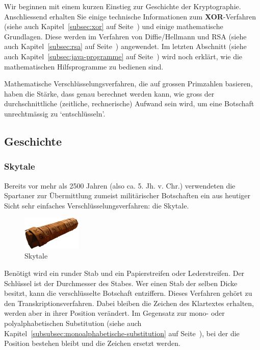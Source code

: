 Wir beginnen mit einem kurzen Einstieg zur Geschichte der Kryptographie.
Anschliessend erhalten Sie einige technische Informationen zum \textbf{XOR}-Verfahren
(siehe auch Kapitel~\ref{subsec:xor} auf Seite~\pageref{subsec:xor}) und einige
mathematische Grundlagen. Diese werden im Verfahren von Diffie/Hellmann und
RSA (siehe auch Kapitel~\ref{subsec:rsa} auf Seite~\pageref{subsec:rsa}) angewendet.
Im letzten Abschnitt (siehe auch Kapitel~\ref{subsec:java-programme} auf
Seite~\pageref{subsec:java-programme}) wird noch erklärt, wie die mathematischen
Hilfsprogramme zu bedienen sind.

Mathematische Verschlüsselungsverfahren, die auf grossen Primzahlen basieren,
haben die Stärke, dass genau berechnet werden kann, wie gross der durchschnittliche
(zeitliche, rechnerische) Aufwand sein wird, um eine Botschaft unrechtmässig
zu `entschlüsseln'.

\subsection{Geschichte}
\subsubsection*{Skytale}

Bereits vor mehr als 2500 Jahren (also ca. 5. Jh. v. Chr.) verwendeten die
Spartaner zur Übermittlung zumeist militärischer Botschaften ein aus heutiger
Sicht sehr einfaches Verschlüsselungsverfahren: die Skytale.

\begin{figure}
    \begin{center}
        \includegraphics[width=0.25\textwidth]{images/Skytale.png}
    \end{center}
    \caption{Skytale}
\end{figure}

Benötigt wird ein runder Stab und ein Papierstreifen oder Lederstreifen.
Der Schlüssel ist der Durchmesser des Stabes. Wer einen Stab der selben
Dicke besitzt, kann die verschlüsselte Botschaft entziffern. Dieses
Verfahren gehört zu den Transkriptionsverfahren. Dabei bleiben die
Zeichen des Klartextes erhalten, werden aber in ihrer Position verändert.
Im Gegensatz zur mono- oder polyalphabetischen Substitution
(siehe auch Kapitel~\ref{subsubsec:monoalphabetische-substitution} auf
Seite~\pageref{subsubsec:monoalphabetische-substitution}), bei der die
Position bestehen bleibt und die Zeichen ersetzt werden.

